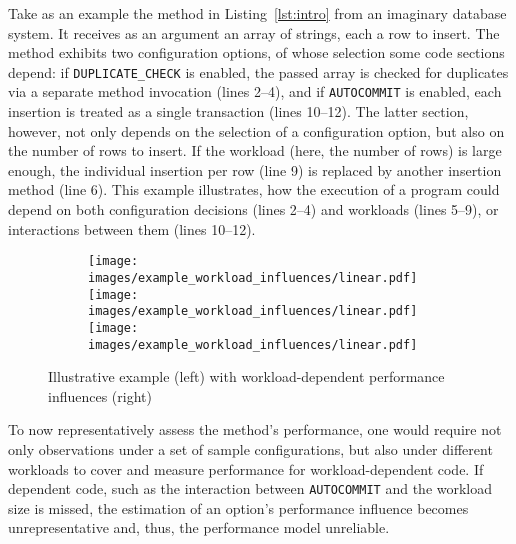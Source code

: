 Take as an example the method in Listing~\ref{lst:intro} from an imaginary database system. It receives as an argument an array of strings, each a row to insert. The method exhibits two configuration options, of whose selection some code sections depend: if \texttt{DUPLICATE\_CHECK} is enabled, the passed array is checked for duplicates via a separate method invocation (lines 2--4), and if \texttt{AUTOCOMMIT} is enabled, each insertion is treated as a single transaction (lines 10--12). The latter section, however, not only depends on the selection of a configuration option, but also on the number of rows to insert. If the workload (here, the number of rows) is large enough, the individual insertion per row (line 9) is replaced by another insertion method (line 6). This example illustrates, how the execution of a program could depend on both configuration decisions (lines 2--4) and workloads (lines 5--9), or interactions between them (lines 10--12).

\begin{figure}
\begin{subfigure}[l]{0.63\linewidth}
	


\end{subfigure}
	\begin{subfigure}[l]{0.35\linewidth}
		\texttt{[image: images/example\_workload\_influences/linear.pdf]}
		\texttt{[image: images/example\_workload\_influences/linear.pdf]}
		\texttt{[image: images/example\_workload\_influences/linear.pdf]}
	\end{subfigure}
	\caption{Illustrative example (left) with workload-dependent performance influences (right)}
	\label{fig:intro}
\end{figure}


To now representatively assess the method's performance, one would require not only observations under a set of sample configurations, but also under different workloads to cover and measure performance for workload-dependent code. If dependent code, such as the interaction between \texttt{AUTOCOMMIT} and the workload size is missed, the estimation of an option's performance influence becomes unrepresentative and, thus, the performance model unreliable.

